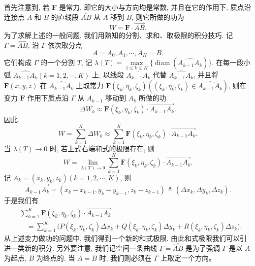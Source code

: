\documentclass[UTF8,12pt,a4paper,fontset=fandol]{ctexart}
\begin{document}
首先注意到, 若 $\boldsymbol F$ 是常力, 即它的大小与方向均是常数, 并且在它的作用下, 质点沿连接点 $A$ 和 $B$ 的直线段 $\overline{AB}$ 从 $A$ 移到 $B$, 则它所做的功为
\[
  W=\boldsymbol F\cdot\overrightarrow{AB}.
\]
为了求解上述的一般问题, 我们用熟知的分割、求和、取极限的积分技巧. 记 $\Gamma=\widehat{AB}$, 沿 $\Gamma$ 依次取分点
\[
  A=A_0,A_1,\cdots,A_K=B.
\]
它们构成 $\Gamma$ 的一个分割 $T$, 记 $\lambda(T)=\max\limits_{1\leqslant k\leqslant K}\{\operatorname{diam}(\widehat{A_{k-1}A_k})\}$. 在每一段小弧 $\widehat{A_{k-1}A_k}(k=1,2,\cdots,K)$ 上, 以线段 $\overline{A_{k-1}A_k}$ 代替 $\widehat{A_{k-1}A_k}$, 并且将 $\boldsymbol F(x,y,z)$ 在 $\widehat{A_{k-1}A_k}$ 上取常力 $\boldsymbol F(\xi_k,\eta_k,\zeta_k)((\xi_k,\eta_k,\zeta_k)\in\widehat{A_{k-1}A_k})$, 则在变力 $\boldsymbol F$ 作用下质点沿 $\Gamma$ 从 $A_{k-1}$ 移动到 $A_k$ 所做的功
\[
  \Delta W_k\approx \boldsymbol F(\xi_k,\eta_k,\zeta_k)\cdot\overrightarrow{A_{k-1}A_k}.
\]
因此
\[
  W=\sum_{k=1}^K\Delta W_k
  \approx \sum_{k=1}^K \boldsymbol F(\xi_k,\eta_k,\zeta_k)\cdot\overrightarrow{A_{k-1}A_k}.
\]
当 $\lambda(T)\to0$ 时, 若上式右端和式的极限存在, 则
\[
  W=\lim_{\lambda(T)\to0}\sum_{k=1}^K
  \boldsymbol F(\xi_k,\eta_k,\zeta_k)\cdot\overrightarrow{A_{k-1}A_k}.
\]
记 $A_k=(x_k,y_k,z_k)(k=1,2,\cdots,K)$, 则
\[
  \overrightarrow{A_{k-1}A_k}
  =(x_k-x_{k-1},y_k-y_{k-1},z_k-z_{k-1})
  \triangleq(\Delta x_k,\Delta y_k,\Delta z_k).
\]
于是我们有
\[
\begin{aligned}
  &\sum_{k=1}^K \boldsymbol F(\xi_k,\eta_k,\zeta_k)\cdot\overrightarrow{A_{k-1}A_k}\\
  &\quad=\sum_{k=1}^K\bigl(P(\xi_k,\eta_k,\zeta_k)\Delta x_k
    +Q(\xi_k,\eta_k,\zeta_k)\Delta y_k
    +R(\xi_k,\eta_k,\zeta_k)\Delta z_k\bigr).
\end{aligned}
\]
从上述变力做功的问题中, 我们得到一个新的和式极限. 由此和式极限我们可以引进一类新的积分. 另外要注意, 我们记空间一条曲线 $\Gamma=\widehat{AB}$ 是为了强调 $\Gamma$ 是以 $A$ 为起点, $B$ 为终点的. 当 $A=B$ 时, 我们则必须在 $\Gamma$ 上取定一个方向。
\end{document}
